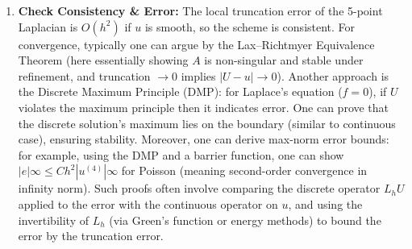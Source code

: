 \documentclass[a4paper,11pt]{article}
\begin{document}
\begin{enumerate}
    \item \textbf{Check Consistency \& Error:} The local truncation error of the 5-point Laplacian is $O(h^2)$ if $u$ is smooth, so the scheme is consistent. For convergence, typically one can argue by the Lax--Richtmyer Equivalence Theorem (here essentially showing $A$ is non-singular and stable under refinement, and truncation $\to0$ implies $|U - u| \to 0$).
          Another approach is the Discrete Maximum Principle (DMP): for Laplace’s equation ($f=0$), if $U$ violates the maximum principle then it indicates error. One can prove that the discrete solution’s maximum lies on the boundary (similar to continuous case), ensuring stability. Moreover, one can derive max-norm error bounds: for example, using the DMP and a barrier function, one can show $|e|\infty \le C h^2 |u^{(4)}|\infty$ for Poisson (meaning second-order convergence in infinity norm). Such proofs often involve comparing the discrete operator $L_h U$ applied to the error with the continuous operator on $u$, and using the invertibility of $L_h$ (via Green’s function or energy methods) to bound the error by the truncation error.
\end{enumerate}
\end{document}
